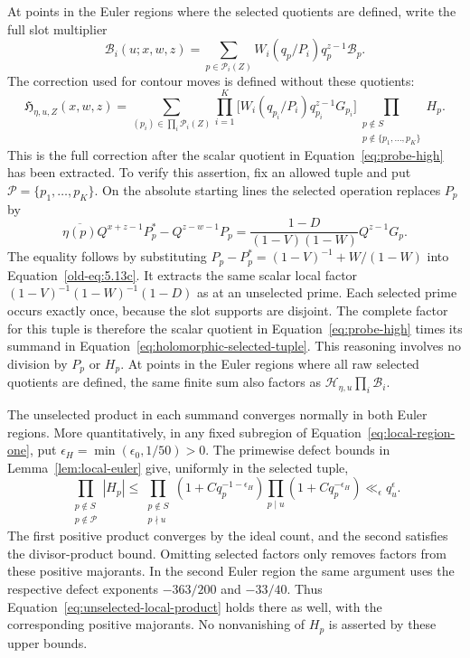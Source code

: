 \documentclass[12pt]{article}
\begin{document}
At points in the Euler regions where the selected quotients are defined,
write the full slot
multiplier
\[
 \mathcal B_i(u;x,w,z)=\sum_{p\in\mathcal P_i(Z)}
           W_i(q_p/P_i)q_p^{z-1}\mathcal B_p.
\]
The correction used for contour moves is defined without these quotients:
\begin{equation}\label{eq:holomorphic-selected-tuple}
 \mathfrak H_{\eta,u,Z}(x,w,z)=
 \sum_{(p_i)\in\prod_i\mathcal P_i(Z)}
 \prod_{i=1}^K\bigl[W_i(q_{p_i}/P_i)q_{p_i}^{z-1}G_{p_i}\bigr]
 \prod_{\substack{p\notin S\\p\notin\{p_1,\ldots,p_K\}}}H_p.
\end{equation}
This is the full correction after the scalar quotient in
Equation~\eqref{eq:probe-high} has been extracted.  To verify this assertion,
fix an allowed tuple and put $\mathcal P=\{p_1,\ldots,p_K\}$.  On the
absolute starting lines the selected operation replaces $P_p$ by
\begin{equation}\label{eq:selected-local-operation}
 \overline{\eta(p)}Q^{x+z-1}P_p^*-Q^{z-w-1}P_p
 =\frac{1-D}{(1-V)(1-W)}Q^{z-1}G_p.
\end{equation}
The equality follows by substituting
$P_p-P_p^*=(1-V)^{-1}+W/(1-W)$ into
Equation~\eqref{old-eq:5.13c}.  It extracts the same scalar local factor
$(1-V)^{-1}(1-W)^{-1}(1-D)$ as at an unselected prime.  Each selected
prime occurs exactly once, because the slot
supports are disjoint.  The complete factor for this tuple is therefore
the scalar quotient in Equation~\eqref{eq:probe-high} times its summand in
Equation~\eqref{eq:holomorphic-selected-tuple}.  This reasoning involves
no division by $P_p$ or $H_p$.  At points in the Euler regions where all
raw selected quotients are defined, the same finite sum also factors as
$\mathcal H_{\eta,u}\prod_i\mathcal B_i$.

The unselected product in each summand converges normally in both Euler
regions.  More quantitatively, in any fixed subregion of
Equation~\eqref{eq:local-region-one}, put
$\epsilon_H=\min(\epsilon_0,1/50)>0$.  The primewise defect bounds in
Lemma~\ref{lem:local-euler} give, uniformly in the selected tuple,
\begin{equation}\label{eq:unselected-local-product}
 \prod_{\substack{p\notin S\\p\notin\mathcal P}}|H_p|
 \le
 \prod_{\substack{p\notin S\\p\nmid u}}
       (1+Cq_p^{-1-\epsilon_H})
 \prod_{p\mid u}(1+Cq_p^{-\epsilon_H})
 \ll_\epsilon q_u^\epsilon.
\end{equation}
The first positive product converges by the ideal count, and the second
satisfies the divisor-product bound.  Omitting selected factors only removes
factors from these positive majorants.  In the second Euler region the same
argument uses the respective defect exponents $-363/200$ and $-33/40$.
Thus Equation~\eqref{eq:unselected-local-product} holds there as well,
with the corresponding positive majorants.  No nonvanishing of $H_p$ is
asserted by these upper bounds.
\end{document}
